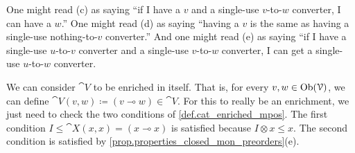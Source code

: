 \documentclass[7Sketches]{subfiles}
\begin{document}
One might read (c) as saying ``if I have a $v$ and a single-use $v$-to-$w$
converter, I can have a $w$.'' One might read (d) as saying ``having a $v$ is
the same as having a single-use nothing-to-$v$ converter.'' And one might read
(e) as saying ``if I have a single-use $u$-to-$v$ converter and a single-use
$v$-to-$w$ converter, I can get a single-use $u$-to-$w$ converter.

\begin{remark}%
\label{rem.quantale_enriches_itself}%
We can consider $\cat{V}$ to be enriched in itself. That is, for every
$v,w\in\operatorname{Ob}(\mathcal{V})$, we can define $\cat{V}(v,w)\coloneqq (v\multimap
w)\in\cat{V}$. For this to really be an enrichment, we just need to check the
two conditions of \cref{def.cat_enriched_mpos}. The first condition
$I\leq\cat{X}(x,x)=(x\multimap x)$ is satisfied because $I\otimes x\leq x$. The
second condition is satisfied by \cref{prop.properties_closed_mon_preorders}(e).
\end{remark}
\end{document}

